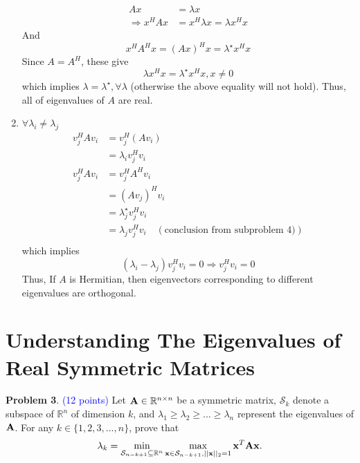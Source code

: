 \documentclass[english,onecolumn]{IEEEtran}
\newcommand{\Rbb}{\mathbb{R}}
\newcommand{\bigS}{\mathcal{S}}
\newcommand{\bA}{{\bf A}}
\newcommand{\bx}{{\bf x}}
\begin{document}
\begin{enumerate}
    	\begin{align*}
    		Ax &= \lambda x\\
    		\Rightarrow x^HAx &= x^H\lambda x = \lambda x^Hx
    	\end{align*}
    	And 
    	$$x^HA^Hx = (Ax)^Hx =\lambda^\star x^Hx$$
    	Since $A = A^H$, these give
    	$$\lambda x^Hx  = \lambda^\star x^Hx, x\ne 0$$
    	which implies $\lambda = \lambda^\star,\forall \lambda$ (otherwise the above equality will not hold). Thus, all of eigenvalues of $A$ are real.
    \item $\forall \lambda_i \ne \lambda_j$
    \begin{align*}
    	v_j^HAv_i &= v_j^H(Av_i)\\
    						& = \lambda_i v_j^Hv_i\\
    	v_j^HAv_i & = v_j^HA^Hv_i\\
    						&=(Av_j)^Hv_i\\
    						&=\lambda_j^\star v_j^Hv_i\\
    						& = \lambda_j v_j^Hv_i \quad (\text{conclusion from subproblem 4)})\\
    \end{align*}
    which implies
    $$(\lambda_i-\lambda_j)v_j^Hv_i = 0 \Rightarrow v_j^Hv_i =0$$
    Thus, If $A$ is Hermitian, then eigenvectors corresponding to different eigenvalues are orthogonal.
\end{enumerate}

\clearpage
\section{Understanding The Eigenvalues of Real Symmetric Matrices}
\noindent\textbf{Problem 3}. \textcolor{blue}{(12 points)}
\noindent 
Let $\bA\in \Rbb^{n\times n}$ be a symmetric matrix, $\bigS_k$ denote a subspace of $\Rbb^n$ of dimension $k$, and $\lambda_1\geq \lambda_2\geq...\geq \lambda_n$ represent the eigenvalues of $\bA$. 
For any $k\in\{1,2,3,...,n\}$, prove that \[\lambda_k=\min\limits_{\bigS_{n-k+1}\subseteq \Rbb^n}\max\limits_{\bx\in\bigS_{n-k+1},||\bx||_2=1} \bx^T\bA\bx.\]
\end{document}
